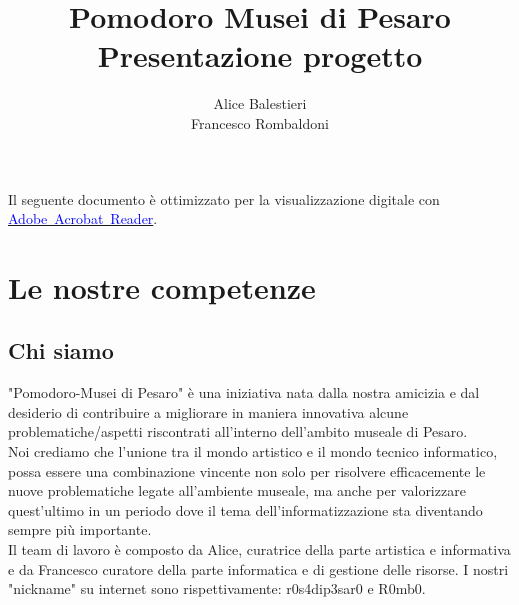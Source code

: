 \documentclass[hidelinks,12pt,a4paper]{article}
\begin{document}
	\begin{flushleft}
		
		\title{\textbf{Pomodoro Musei di Pesaro}\\\small{Presentazione progetto}}
		\author{Alice Balestieri\\ Francesco Rombaldoni}
		\date{}
		
		\maketitle
		
		\begin{adjustwidth}{-30mm}{-30mm}
			\vspace*{\fill}
			\centering
			\fboxrule=2pt
			\fbox
			{
				\begin{minipage}{0.85\linewidth}
					Il seguente documento è ottimizzato per la visualizzazione digitale con \href{https://get.adobe.com/it/reader/}{\textcolor{blue}{Adobe~Acrobat~Reader}}.  
				\end{minipage}
			}
		\end{adjustwidth}
		
		\setcounter{page}{1}
		\newpage
		\tableofcontents
		\newpage
		
		\section{Le nostre competenze}
		\subsection{Chi siamo}
		"Pomodoro-Musei di Pesaro" è una iniziativa nata dalla nostra amicizia e dal desiderio di contribuire a migliorare in maniera innovativa alcune problematiche/aspetti riscontrati all'interno dell'ambito museale di Pesaro.\\
		Noi crediamo che l'unione tra il mondo artistico e il mondo tecnico informatico, possa essere una combinazione vincente non solo per risolvere efficacemente le nuove problematiche legate all'ambiente museale, ma anche per valorizzare quest'ultimo in un periodo dove il tema dell'informatizzazione sta diventando sempre più importante.\\
		Il team di lavoro è composto da Alice, curatrice della parte artistica e informativa e da Francesco curatore della parte informatica e di gestione delle risorse. I nostri "nickname" su internet sono rispettivamente: r0s4dip3sar0 e R0mb0. 
		

\end{flushleft}
\end{document}
